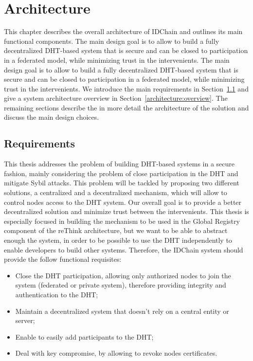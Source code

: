 \chapter{Architecture}
\label{chapter:architecture}

This chapter describes the overall architecture of IDChain and outlines its main functional components.
The main design goal is to allow to build a fully decentralized DHT-based system that is secure and can be closed to participation in a federated model, while minimizing trust in the intervenients.
The main design goal is to allow to build a fully decentralized DHT-based system that is secure and can be closed to participation in a federated model, while minimizing trust in the intervenients.
We introduce the main requirements in Section~\ref{architecture:requirements} and give a system architecture overview in Section~\ref{architecture:overview}.
The remaining sections describe the in more detail the architecture of the solution and discuss the main design choices.

\section{Requirements}\label{architecture:requirements}

This thesis addresses the problem of building DHT-based systems in a secure fashion, mainly considering the problem of close participation in the DHT and mitigate Sybil attacks.
This problem will be tackled by proposing two different solutions, a centralized and a decentralized mechanism, which will allow to control nodes access to the DHT system.
Our overall goal is to provide a better decentralized solution and minimize trust between the intervenients.
This thesis is especially focused in building the mechanism to be used in the Global Registry component of the reThink architecture, but we want to be able to abstract enough the system, in order to be possible to use the DHT independently to enable developers to build other systems.
Therefore, the IDChain system should provide the follow functional requisites:

\begin{itemize}
  \item Close the DHT participation, allowing only authorized nodes to join the system (federated or private system), therefore providing integrity and authentication to the DHT;
  \item Maintain a decentralized system that doesn't rely on a central entity or server;
  \item Enable to easily add participants to the DHT;
  \item Deal with key compromise, by allowing to revoke nodes certificates.
\end{itemize}

